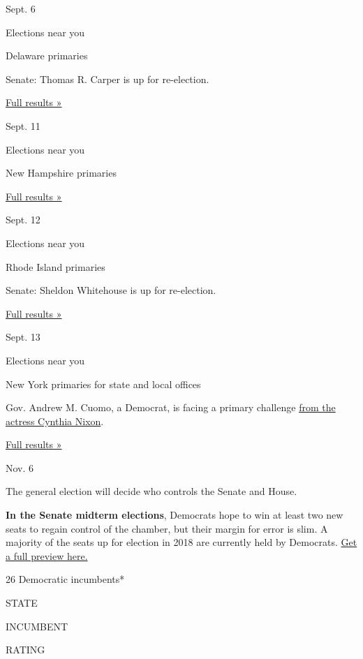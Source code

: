 Sept. 6

Elections near you

Delaware primaries

Senate: Thomas R. Carper is up for re-election.

\href{https://www.nytimes3xbfgragh.onion/interactive/2018/09/06/us/elections/results-delaware-primary-elections.html}{Full
results »}

Sept. 11

Elections near you

New Hampshire primaries

\href{https://www.nytimes3xbfgragh.onion/interactive/2018/09/11/us/elections/results-new-hampshire-primary-elections.html}{Full
results »}

Sept. 12

Elections near you

Rhode Island primaries

Senate: Sheldon Whitehouse is up for re-election.

\href{https://www.nytimes3xbfgragh.onion/interactive/2018/09/12/us/elections/results-rhode-island-primary-elections.html}{Full
results »}

Sept. 13

Elections near you

New York primaries for state and local offices

Gov. Andrew M. Cuomo, a Democrat, is facing a primary challenge
\href{https://www.nytimes3xbfgragh.onion/2018/03/19/nyregion/cynthia-nixon-new-york-governor-cuomo.html}{from
the actress Cynthia Nixon}.

\href{https://www.nytimes3xbfgragh.onion/interactive/2018/09/13/us/elections/results-new-york-primary-elections.html}{Full
results »}

Nov. 6

The general election will decide who controls the Senate and House.

\textbf{In the Senate midterm elections}, Democrats hope to win at least
two new seats to regain control of the chamber, but their margin for
error is slim. A majority of the seats up for election in 2018 are
currently held by Democrats.
\href{https://www.nytimes3xbfgragh.onion/interactive/2018/02/07/us/politics/senate-midterm-elections.html}{Get
a full preview here.}

26 Democratic incumbents*

STATE

INCUMBENT

RATING

